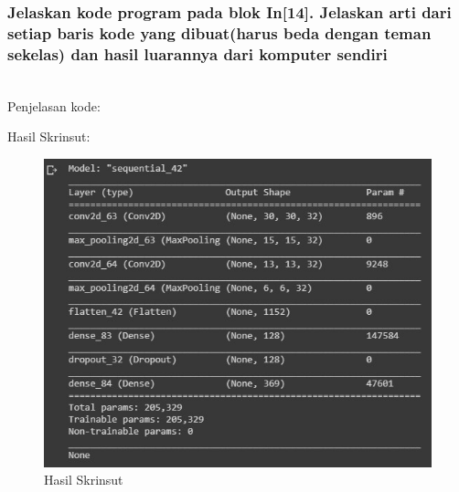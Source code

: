\subsubsection{Jelaskan kode program pada blok  In[14]. Jelaskan arti dari setiap baris kode yang dibuat(harus beda dengan teman sekelas) dan hasil luarannya dari komputer sendiri}
\hfill\\
Penjelasan kode:

Hasil Skrinsut:
\begin{figure}[H]
	\centering
	\includegraphics[scale=0.5]{figures/1174083/figures7/p14.png}
	\caption{Hasil Skrinsut}
\end{figure}

